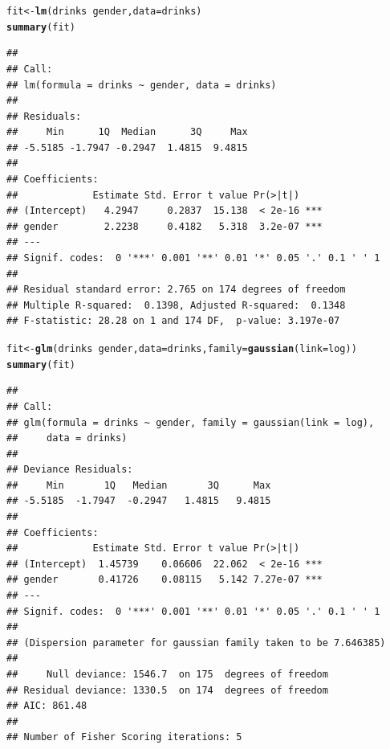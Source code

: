 \documentclass[landscape,twocolumn,letterpaper,9pt,reqno]{article}\usepackage[]{graphicx}\usepackage[]{color}
\newcommand{\hlopt}[1]{\textcolor[rgb]{0,0,0}{#1}}%
\newcommand{\hlstd}[1]{\textcolor[rgb]{0.345,0.345,0.345}{#1}}%
\newcommand{\hlkwb}[1]{\textcolor[rgb]{0.69,0.353,0.396}{#1}}%
\newcommand{\hlkwc}[1]{\textcolor[rgb]{0.333,0.667,0.333}{#1}}%
\newcommand{\hlkwd}[1]{\textcolor[rgb]{0.737,0.353,0.396}{\textbf{#1}}}%
\newenvironment{knitrout}{}{} %
\begin{document}
\begin{knitrout}\footnotesize
{}\color{fgcolor}
\begin{alltt}
\hlstd{fit} \hlkwb{<-} \hlkwd{lm}\hlstd{(drinks} \hlopt{~} \hlstd{gender,} \hlkwc{data} \hlstd{= drinks)}
\hlkwd{summary}\hlstd{(fit)}
\end{alltt}
\begin{verbatim}
## 
## Call:
## lm(formula = drinks ~ gender, data = drinks)
## 
## Residuals:
##     Min      1Q  Median      3Q     Max 
## -5.5185 -1.7947 -0.2947  1.4815  9.4815 
## 
## Coefficients:
##             Estimate Std. Error t value Pr(>|t|)    
## (Intercept)   4.2947     0.2837  15.138  < 2e-16 ***
## gender        2.2238     0.4182   5.318  3.2e-07 ***
## ---
## Signif. codes:  0 '***' 0.001 '**' 0.01 '*' 0.05 '.' 0.1 ' ' 1
## 
## Residual standard error: 2.765 on 174 degrees of freedom
## Multiple R-squared:  0.1398,	Adjusted R-squared:  0.1348 
## F-statistic: 28.28 on 1 and 174 DF,  p-value: 3.197e-07
\end{verbatim}
\begin{alltt}
\hlstd{fit} \hlkwb{<-} \hlkwd{glm}\hlstd{(drinks} \hlopt{~} \hlstd{gender,} \hlkwc{data} \hlstd{= drinks,} \hlkwc{family} \hlstd{=} \hlkwd{gaussian}\hlstd{(}\hlkwc{link}\hlstd{=log))}
\hlkwd{summary}\hlstd{(fit)}
\end{alltt}
\begin{verbatim}
## 
## Call:
## glm(formula = drinks ~ gender, family = gaussian(link = log), 
##     data = drinks)
## 
## Deviance Residuals: 
##     Min       1Q   Median       3Q      Max  
## -5.5185  -1.7947  -0.2947   1.4815   9.4815  
## 
## Coefficients:
##             Estimate Std. Error t value Pr(>|t|)    
## (Intercept)  1.45739    0.06606  22.062  < 2e-16 ***
## gender       0.41726    0.08115   5.142 7.27e-07 ***
## ---
## Signif. codes:  0 '***' 0.001 '**' 0.01 '*' 0.05 '.' 0.1 ' ' 1
## 
## (Dispersion parameter for gaussian family taken to be 7.646385)
## 
##     Null deviance: 1546.7  on 175  degrees of freedom
## Residual deviance: 1330.5  on 174  degrees of freedom
## AIC: 861.48
## 
## Number of Fisher Scoring iterations: 5
\end{verbatim}

\end{knitrout}









	
	
\end{document}

